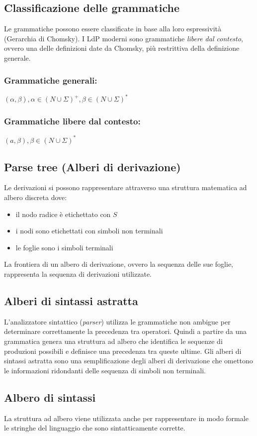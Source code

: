 \documentclass{article}
\begin{document}
\subsection*{Classificazione delle grammatiche}
Le grammatiche possono essere classificate in base alla loro espressività (Gerarchia di Chomsky). I LdP moderni sono grammatiche \emph{libere dal contesto}, ovvero una delle definizioni date da Chomsky, più restrittiva della definizione generale.
\subsubsection*{Grammatiche generali: }
\((\alpha, \beta), \alpha \in (N \cup \Sigma)^+, \beta \in (N \cup \Sigma)^*\)
\subsubsection*{Grammatiche libere dal contesto: }
\((a, \beta), \beta \in (N \cup \Sigma)^*\)
\subsection*{Parse tree (Alberi di derivazione)}
Le derivazioni si possono rappresentare attraverso una struttura matematica ad albero discreta dove:
\begin{itemize}
  \item il nodo radice è etichettato con \(S\)
  \item i nodi sono etichettati con simboli non terminali
  \item le foglie sono i simboli terminali
\end{itemize}
La frontiera di un albero di derivazione, ovvero la sequenza delle sue foglie, rappresenta la sequenza di derivazioni utilizzate.
\subsection*{Alberi di sintassi astratta}
L'analizzatore sintattico (\emph{parser}) utilizza le grammatiche non ambigue per determinare correttamente la precedenza tra operatori. Quindi a partire da una grammatica genera una struttura ad albero che identifica le sequenze di produzioni possibili e definisce una precedenza tra queste ultime. Gli alberi di sintassi astratta sono una semplificazione degli alberi di derivazione che omettono le informazioni ridondanti delle sequenza di simboli non terminali.
\subsection*{Albero di sintassi}
La struttura ad albero viene utilizzata anche per rappresentare in modo formale le stringhe del linguaggio che sono sintatticamente corrette.
\end{document}

